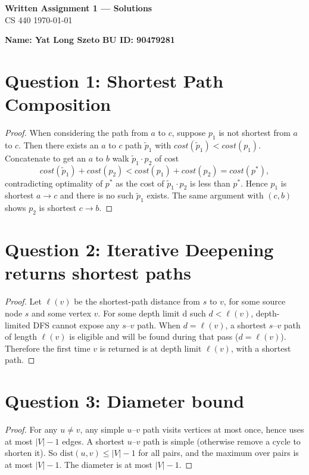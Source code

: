 \documentclass[11pt]{article}
\theoremstyle{definition}
\theoremstyle{remark}
\newcommand{\dist}{\mathrm{dist}}
\begin{document}
\begin{center}
{\Large \textbf{Written Assignment 1 — Solutions}}\\[0.25em]
CS 440 \quad \today
\end{center}

\noindent\textbf{Name: Yat Long Szeto} \quad
\textbf{BU ID:  90479281} 

\bigskip

\section*{Question 1: Shortest Path Composition}

\begin{proof}
When considering the path from $a$ to $c$,
suppose $p_1$ is not shortest from $a$ to $c$. 
Then there exists an $a$ to $c$ path $\tilde p_1$ with $cost(\tilde p_1) < cost(p_1)$. 
Concatenate to get an $a$ to $b$ walk $\tilde p_1\cdot p_2$ of cost
\[
cost(\tilde p_1)+cost(p_2) < cost(p_1)+cost(p_2)=cost(p^\ast),
\]
contradicting optimality of $p^\ast$ as the cost of $\tilde p_1\cdot p_2$ is less than $p^\ast$.
 Hence $p_1$ is shortest $a\!\to\! c$ and there is no such $\tilde p_1$ exists.
 The same argument with $(c,b)$ shows $p_2$ is shortest $c\!\to\! b$.
\end{proof}

\section*{Question 2: Iterative Deepening returns shortest paths}

\begin{proof}
Let $\ell(v)$ be the shortest-path distance from $s$ to $v$, for some source node $s$ and some vertex $v$.
For some depth limit d such $d<\ell(v)$, depth-limited DFS cannot expose any $s$–$v$ path.
When $d=\ell(v)$, a shortest $s$–$v$ path of length $\ell(v)$ is eligible and will be found during that pass ($d=\ell(v)$). 
Therefore the first time $v$ is returned is at depth limit $\ell(v)$, with a shortest path.

\end{proof}

\section*{Question 3: Diameter bound}

\begin{proof}
For any $u\neq v$, any simple $u$–$v$ path visits vertices at most once, 
hence uses at most $|V|-1$ edges.
 A shortest $u$–$v$ path is simple (otherwise remove a cycle to shorten it). 
 So $\dist(u,v)\le |V|-1$ for all pairs, and the maximum over pairs is at most $|V|-1$.
 The diameter is at most $|V|-1$.
\end{proof}
\end{document}
